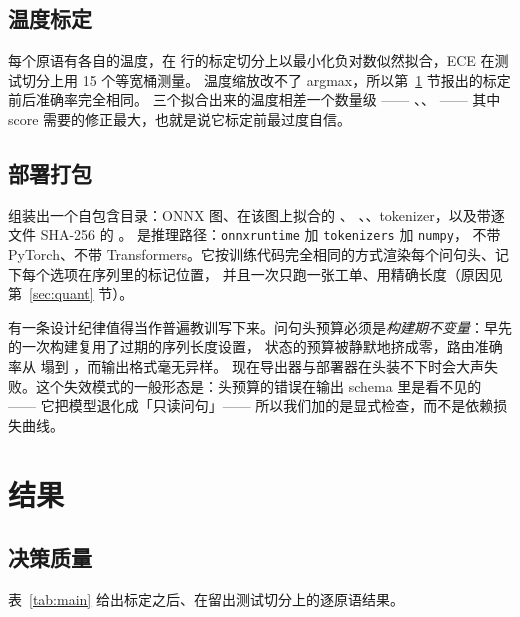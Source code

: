 \documentclass[11pt,a4paper]{article}
\begin{document}
\subsection{温度标定}

每个原语有各自的温度，在 \RowsCalib{} 行的标定切分上以最小化负对数似然拟合，ECE 在测试切分上用 15 个等宽桶测量。
温度缩放改不了 argmax，所以第~\ref{sec:results} 节报出的标定前后准确率完全相同。
三个拟合出来的温度相差一个数量级 —— \TChoice、\TScore、\TNoul{} —— 其中 score 需要的修正最大，也就是说它标定前最过度自信。

\subsection{部署打包}

 组装出一个自包含目录：ONNX 图、在该图上拟合的 、
、、tokenizer，以及带逐文件 SHA-256 的 。
 是推理路径：\texttt{onnxruntime} 加 \texttt{tokenizers} 加 \texttt{numpy}，
不带 PyTorch、不带 Transformers。它按训练代码完全相同的方式渲染每个问句头、记下每个选项在序列里的标记位置，
并且一次只跑一张工单、用精确长度（原因见第~\ref{sec:quant} 节）。

有一条设计纪律值得当作普遍教训写下来。问句头预算必须是\emph{构建期不变量}：早先的一次构建复用了过期的序列长度设置，
状态的预算被静默地挤成零，路由准确率从 \AccChoice{} 塌到 \AccCollapsed{}，而输出格式毫无异样。
现在导出器与部署器在头装不下时会大声失败。这个失效模式的一般形态是：头预算的错误在输出 schema 里是看不见的 ——
它把模型退化成「只读问句」—— 所以我们加的是显式检查，而不是依赖损失曲线。

\section{结果}
\label{sec:results}

\subsection{决策质量}

表~\ref{tab:main} 给出标定之后、在留出测试切分上的逐原语结果。

\begin{table}[t]
\centering
\small
\caption{标定之后、在留出测试切分（\RowsTest{} 行）上的逐原语结果。「均衡准确率」是按 gold 类别宏平均的准确率；
「软准确率」是分给 gold 选项的平均概率。ECE 越低越好。}
\label{tab:main}

\end{table}
\end{document}
